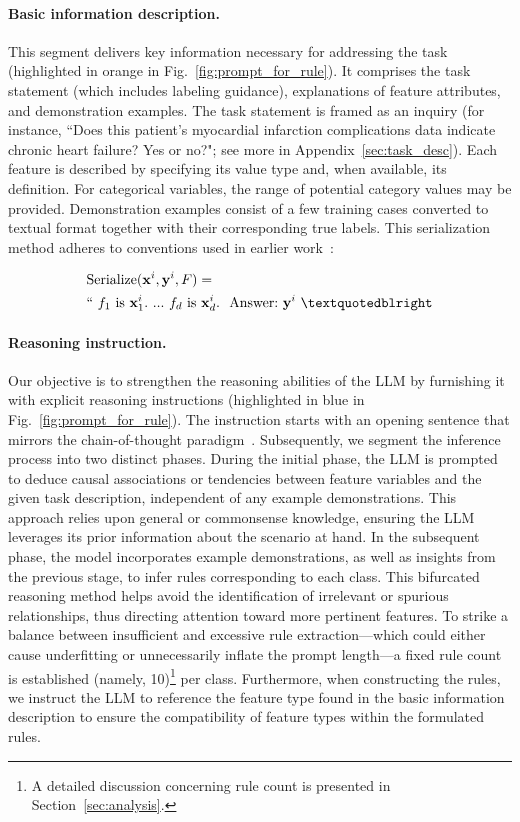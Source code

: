 \paragraph{Basic information description.} This segment delivers key information necessary for addressing the task (highlighted in orange in Fig.~\ref{fig:prompt_for_rule}). It comprises the task statement (which includes labeling guidance), explanations of feature attributes, and demonstration examples. The task statement is framed as an inquiry (for instance, ``Does this patient's myocardial infarction complications data indicate chronic heart failure? Yes or no?"; see more in Appendix~\ref{sec:task_desc}). Each feature is described by specifying its value type and, when available, its definition. For categorical variables, the range of potential category values may be provided. Demonstration examples consist of a few training cases converted to textual format together with their corresponding true labels. This serialization method adheres to conventions used in earlier work~\cite{dinh2022lift,hegselmann2023tabllm}:

\begin{align}
&\text{Serialize}(\mathbf{x}^i,\mathbf{y}^i, F) = \nonumber \\ 
&``\ f_1\ \text{is}\ \mathbf{x}^i_1.\ ... \ f_d\  \text{is}\  \mathbf{x}^i_d.\ \ \text{Answer:}\  \mathbf{y}^i\ ”
\end{align}

\vspace*{-0.12in}
\paragraph{Reasoning instruction.} Our objective is to strengthen the reasoning abilities of the LLM by furnishing it with explicit reasoning instructions (highlighted in blue in Fig.~\ref{fig:prompt_for_rule}). The instruction starts with an opening sentence that mirrors the chain-of-thought paradigm~\cite{wei2022chain}. Subsequently, we segment the inference process into two distinct phases. During the initial phase, the LLM is prompted to deduce causal associations or tendencies between feature variables and the given task description, independent of any example demonstrations. This approach relies upon general or commonsense knowledge, ensuring the LLM leverages its prior information about the scenario at hand. In the subsequent phase, the model incorporates example demonstrations, as well as insights from the previous stage, to infer rules corresponding to each class. This bifurcated reasoning method helps avoid the identification of irrelevant or spurious relationships, thus directing attention toward more pertinent features. To strike a balance between insufficient and excessive rule extraction—which could either cause underfitting or unnecessarily inflate the prompt length—a fixed rule count is established (namely, 10)\footnote{A detailed discussion concerning rule count is presented in Section~\ref{sec:analysis}.} per class. Furthermore, when constructing the rules, we instruct the LLM to reference the feature type found in the basic information description to ensure the compatibility of feature types within the formulated rules.

